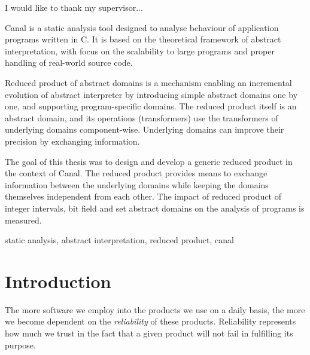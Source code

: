 \documentclass[12pt,oneside]{fithesis2}
\theoremstyle{definition}
\begin{document}
\FrontMatter
\ThesisTitlePage

\begin{ThesisDeclaration}
\DeclarationText
\AdvisorName
\end{ThesisDeclaration}

\begin{ThesisThanks}
I would like to thank my supervisor...
\end{ThesisThanks}

\begin{ThesisAbstract}
Canal is a static analysis tool designed to analyse behaviour of application programs written in C. It is based on the theoretical framework of abstract interpretation, with focus on the scalability to large programs and proper handling of real-world source code.

Reduced product of abstract domains is a mechanism enabling an incremental evolution of abstract interpreter by introducing simple abstract domains one by one, and supporting program-specific domains. The reduced product itself is an abstract domain, and its operations (transformers) use the transformers of underlying domains component-wise. Underlying domains can improve their precision by exchanging information.

The goal of this thesis was to design and develop a generic reduced product in the context of Canal. The reduced product provides means to exchange information between the underlying domains while keeping the domains themselves independent from each other. The impact of reduced product of integer intervals, bit field and set abstract domains on the analysis of programs is measured.
\end{ThesisAbstract}

\begin{ThesisKeyWords}
static analysis, abstract interpretation, reduced product, canal
\end{ThesisKeyWords}

\tableofcontents

\MainMatter
\chapter{Introduction}

The more software we employ into the products we use on a daily basis, the more we become dependent on the \textit{reliability} of these products. Reliability represents how much we trust in the fact that a given product will not fail in fulfilling its purpose.
\end{document}
